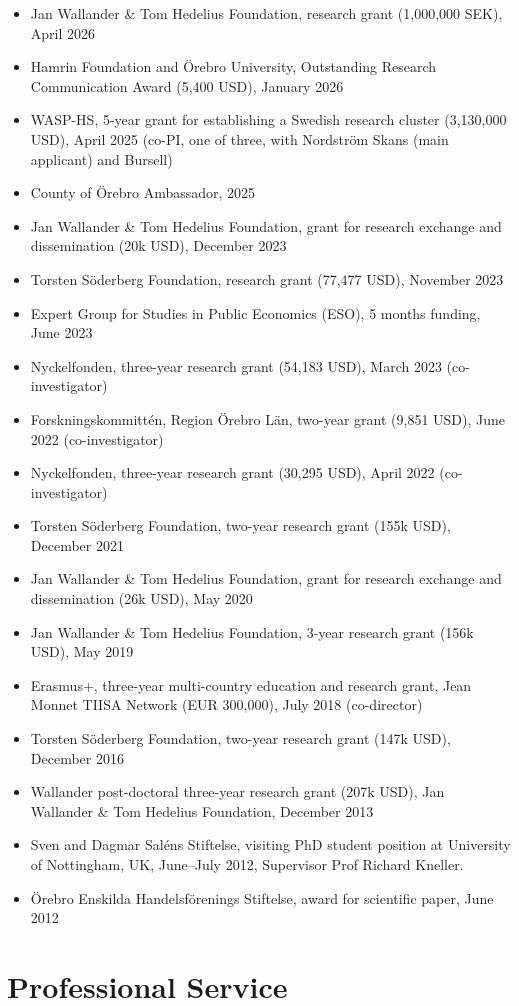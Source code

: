 \documentclass[11pt,a4paper]{article}
\newcommand{\cventry}[1]{\item #1}
\begin{document}
\begin{itemize}
 \cventry{Jan Wallander \& Tom Hedelius Foundation, research grant (1,000,000 SEK), April 2026}
 \cventry{Hamrin Foundation and Örebro University, Outstanding Research Communication Award (5,400 USD), January 2026}
 \cventry{WASP-HS, 5-year grant for establishing a Swedish research cluster (3,130,000 USD), April 2025 (co-PI, one of three, with Nordström Skans (main applicant) and Bursell)}
 \cventry{County of Örebro Ambassador, 2025}
 \cventry{Jan Wallander \& Tom Hedelius Foundation, grant for research exchange and dissemination (20k USD), December 2023}
 \cventry{Torsten Söderberg Foundation, research grant (77,477 USD), November 2023}
 \cventry{Expert Group for Studies in Public Economics (ESO), 5 months funding, June 2023}
 \cventry{Nyckelfonden, three-year research grant (54,183 USD), March 2023 (co-investigator)}
 \cventry{Forskningskommittén, Region Örebro Län, two-year grant (9,851 USD), June 2022 (co-investigator)}
 \cventry{Nyckelfonden, three-year research grant (30,295 USD), April 2022 (co-investigator)}
 \cventry{Torsten Söderberg Foundation, two-year research grant (155k USD), December 2021}
 \cventry{Jan Wallander \& Tom Hedelius Foundation, grant for research exchange and dissemination (26k USD), May 2020}
 \cventry{Jan Wallander \& Tom Hedelius Foundation, 3-year research grant (156k USD), May 2019}
 \cventry{Erasmus+, three-year multi-country education and research grant, Jean Monnet TIISA Network (EUR 300,000), July 2018 (co-director)} %
 \cventry{Torsten Söderberg Foundation, two-year research grant (147k USD), December 2016}
 \cventry{Wallander post-doctoral three-year research grant (207k USD), Jan Wallander \& Tom Hedelius Foundation, December 2013}
 \cventry{Sven and Dagmar Saléns Stiftelse, visiting PhD student position at University of Nottingham, UK, June--July 2012, Supervisor Prof Richard Kneller.}
 \cventry{Örebro Enskilda Handelsförenings Stiftelse, award for scientific paper, June 2012}
\end{itemize}

\section{Professional Service}
\end{document}
